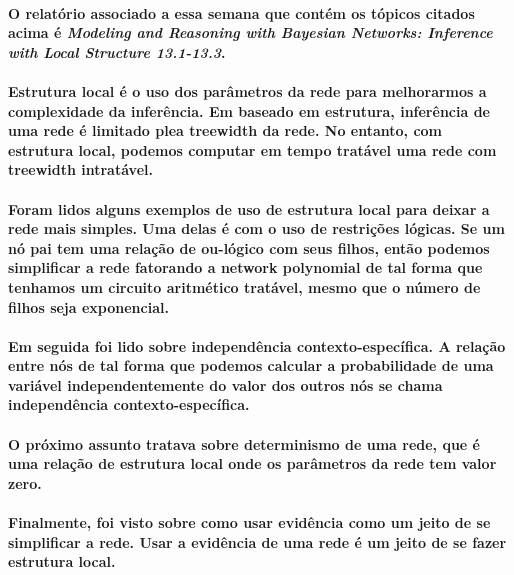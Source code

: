\documentclass[a4paper,10pt]{article}
\theoremstyle{plain}
\begin{document}
\paragraph{
  O relatório associado a essa semana que contém os tópicos citados acima é \textit{Modeling and
  Reasoning with Bayesian Networks: Inference with Local Structure 13.1-13.3}\cite{report-8}.
}

\paragraph{
  Estrutura local é o uso dos parâmetros da rede para melhorarmos a complexidade da inferência.
  Em baseado em estrutura, inferência de uma rede é limitado plea treewidth da rede. No entanto,
  com estrutura local, podemos computar em tempo tratável uma rede com treewidth intratável.
}

\paragraph{
  Foram lidos alguns exemplos de uso de estrutura local para deixar a rede mais simples. Uma delas
  é com o uso de restrições lógicas. Se um nó pai tem uma relação de ou-lógico com seus filhos,
  então podemos simplificar a rede fatorando a network polynomial de tal forma que tenhamos um
  circuito aritmético tratável, mesmo que o número de filhos seja exponencial.
}

\paragraph{
  Em seguida foi lido sobre independência contexto-específica. A relação entre nós de tal forma que
  podemos calcular a probabilidade de uma variável independentemente do valor dos outros nós se
  chama independência contexto-específica.
}

\paragraph{
  O próximo assunto tratava sobre determinismo de uma rede, que é uma relação de estrutura local
  onde os parâmetros da rede tem valor zero.
}

\paragraph{
  Finalmente, foi visto sobre como usar evidência como um jeito de se simplificar a rede. Usar a
  evidência de uma rede é um jeito de se fazer estrutura local.
}
\end{document}
